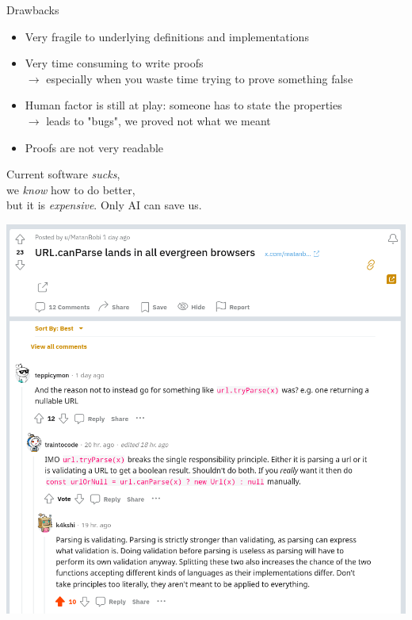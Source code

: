 \documentclass[compress,12pt,xcolor={dvipsnames}]{beamer}
\begin{document}
\begin{frame}
\end{frame}

\begin{frame}{Drawbacks}
    \begin{itemize}
        \item Very fragile to underlying definitions and implementations
        \item Very time consuming to write proofs \\
              $\to$ especially when you waste time trying to prove something false
        \item Human factor is still at play: someone has to state the properties \\
              $\to$ leads to "bugs", we proved not what we meant
        \item Proofs are not very readable
    \end{itemize}
\end{frame}


\End
\begin{frame}
    \centering
    Current software \textit{sucks}, \\we \textit{know} how to do better, \\but it is \textit{expensive}.
    \vfill
    Only AI can save us.
\end{frame}

\begin{frame}[plain]
    \centering
    \includegraphics[height=\textheight]{url_can_parse.png}
\end{frame}
\end{document}
